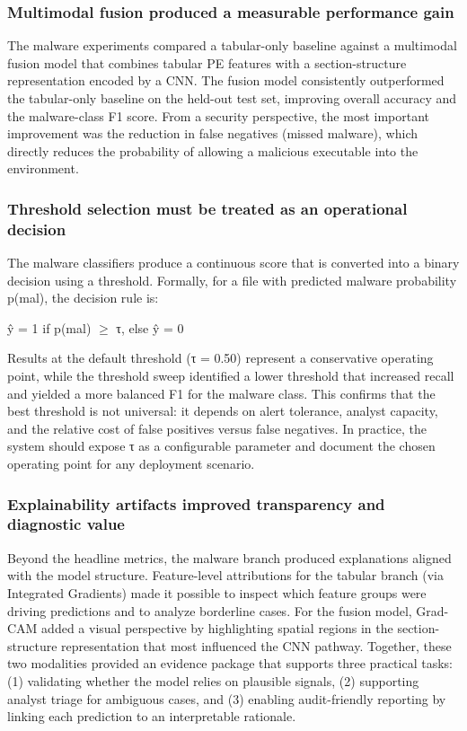 \documentclass[conference]{IEEEtran}
\begin{document}
\subsubsection{Multimodal fusion produced a measurable performance gain}

The malware experiments compared a tabular-only baseline against a multimodal fusion model that combines tabular PE features with a section-structure representation encoded by a CNN. The fusion model consistently outperformed the tabular-only baseline on the held-out test set, improving overall accuracy and the malware-class F1 score. From a security perspective, the most important improvement was the reduction in false negatives (missed malware), which directly reduces the probability of allowing a malicious executable into the environment.

\subsubsection{Threshold selection must be treated as an operational decision}

The malware classifiers produce a continuous score that is converted into a binary decision using a threshold. Formally, for a file with predicted malware probability p(mal), the decision rule is:

ŷ = 1  if  p(mal) $\geq$ τ,   else  ŷ = 0

Results at the default threshold (τ = 0.50) represent a conservative operating point, while the threshold sweep identified a lower threshold that increased recall and yielded a more balanced F1 for the malware class. This confirms that the best threshold is not universal: it depends on alert tolerance, analyst capacity, and the relative cost of false positives versus false negatives. In practice, the system should expose τ as a configurable parameter and document the chosen operating point for any deployment scenario.

\subsubsection{Explainability artifacts improved transparency and diagnostic value}

Beyond the headline metrics, the malware branch produced explanations aligned with the model structure. Feature-level attributions for the tabular branch (via Integrated Gradients) made it possible to inspect which feature groups were driving predictions and to analyze borderline cases. For the fusion model, Grad-CAM added a visual perspective by highlighting spatial regions in the section-structure representation that most influenced the CNN pathway. Together, these two modalities provided an evidence package that supports three practical tasks: (1) validating whether the model relies on plausible signals, (2) supporting analyst triage for ambiguous cases, and (3) enabling audit-friendly reporting by linking each prediction to an interpretable rationale.
\end{document}
